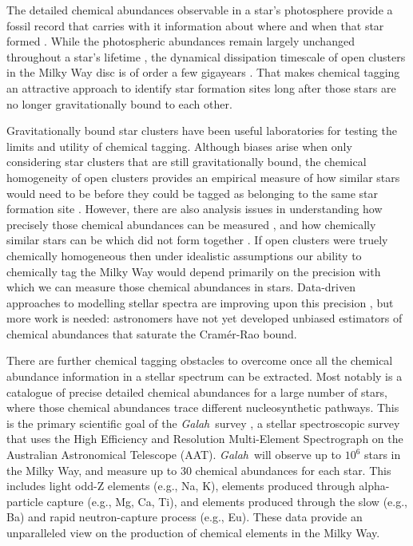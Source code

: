 \documentclass[twocolumn]{aastex62}
\newcommand{\project}[1]{\textsl{#1}}
\newcommand{\Galah}{\project{Galah}}
\begin{document}
The detailed chemical abundances observable in a star's photosphere provide a
fossil record that carries with it information about where and when that star
formed \citep{Freeman;Bland-Hawthorn:2002}. While the photospheric abundances remain largely unchanged throughout
a star's lifetime \citep[however see][]{Dotter:2017,Ness:2018b}, the dynamical 
dissipation timescale of open clusters in the Milky Way disc is of order a few 
gigayears \citep{Portegies-Zwart:1998}. That makes chemical tagging an attractive 
approach to identify star formation sites long after those stars are no longer 
gravitationally bound to each other.


Gravitationally bound star clusters have been useful laboratories for
testing the limits and utility of chemical tagging. Although biases arise when
only considering star clusters that are still gravitationally bound, the chemical
homogeneity of open clusters provides an empirical measure of how similar stars
would need to be before they could be tagged as belonging to the same
star formation site \citep{Mitschang:2014}. However, there are also analysis
issues in understanding how precisely those chemical abundances can be measured
\citep{Bovy:2016}, and how chemically similar stars can be which did not form 
together \citep[doppleg\"angers;][]{Ness:2018}.
If open clusters were truely chemically homogeneous then under idealistic 
assumptions our ability to chemically tag the Milky Way would depend primarily
on the precision with which we can measure those chemical abundances in stars. 
Data-driven approaches to modelling stellar spectra are
improving upon this precision \citep{Ness:2015,Ness:2018a,Ness:2018b,
Casey:2016,Casey:2017,Ho:2017b,Ho:2017a,Leung;Bovy:2018}, but more work is
needed: astronomers have not yet developed unbiased estimators of chemical
abundances that saturate the Cram\'er-Rao bound.


There are further chemical tagging obstacles to overcome once all the chemical 
abundance information in a stellar spectrum can be extracted. Most notably is a 
catalogue of precise detailed chemical abundances for a large number of stars,
where those chemical abundances trace different nucleosynthetic pathways.
This is the primary scientific goal of the \Galah\ survey \citep{DeSilva:2015,Martell:2017,Buder:2018},
a stellar spectroscopic survey that uses the High Efficiency and Resolution 
Multi-Element Spectrograph \citep[\project{HERMES};][]{Sheinis:2015} on the Australian 
Astronomical Telescope (AAT).  \Galah\ will observe up to $10^6$ stars in the 
Milky Way, and measure up to 30 chemical abundances for each star. This includes
light odd-Z elements (e.g., Na, K), elements produced through
alpha-particle capture (e.g., Mg, Ca, Ti), and elements produced
through the slow (e.g., Ba) and rapid neutron-capture process
(e.g., Eu). These data provide an unparalleled view on the production
of chemical elements in the Milky Way.
\end{document}
